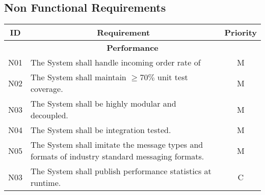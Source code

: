 \subsection{Non Functional Requirements}
\begin{table}[htbp]
\begin{center}
\begin{longtable}{c p{3.5in} c }

\multicolumn{1}{c}{\textbf{ID}}           &
\multicolumn{1}{c}{\textbf{Requirement}}  &
\multicolumn{1}{c}{\textbf{Priority}}     \\
                
\toprule
\multicolumn{3}{c}{\textbf{Performance}}   \\
N01  & The System shall handle incoming order rate of              & M \\ 
N02  & The System shall maintain $\geq70\%$ unit test coverage.    & M \\
N03  & The System shall be highly modular and decoupled.           & M \\
N04  & The System shall be integration tested.	                   & M \\
N05  & The System shall imitate the message types and formats of industry standard messaging formats. & M \\
N03  & The System shall publish performance statistics at runtime. & C \\

         
\end{longtable}
\end{center}
\end{table}

